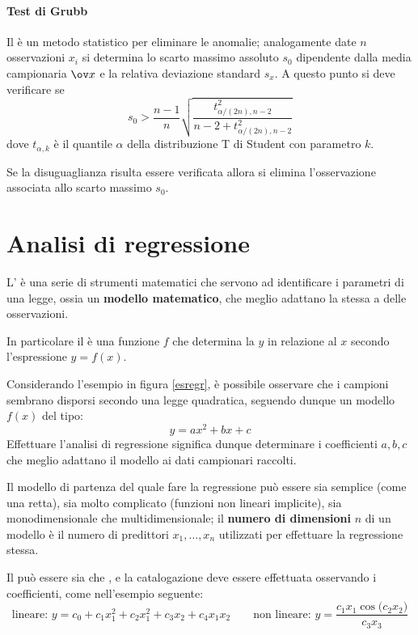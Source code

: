 		\paragraph{Test di Grubb} Il  è un metodo statistico per eliminare le anomalie; analogamente date $n$ osservazioni $x_i$ si determina lo scarto massimo assoluto $s_0$ dipendente dalla media campionaria $\ov x$ e la relativa deviazione standard $s_x$. A questo punto si deve verificare se
		\[ s_0 > \frac{ n - 1}{n} \sqrt{\frac{t^2_{\alpha/(2n), n-2}}{n-2+t^2_{\alpha/(2n), n-2}}} \]
		dove $t_{\alpha,k}$ è il quantile $\alpha$ della distribuzione T di Student con parametro $k$.
		
		Se la disuguaglianza risulta essere verificata allora si elimina l'osservazione associata allo scarto massimo $s_0$.
		
\section{Analisi di regressione}		
	L' è una serie di strumenti matematici che servono ad identificare i parametri di una legge, ossia un \textbf{modello matematico}, che meglio adattano la stessa a delle osservazioni.
	
	In particolare il  è una funzione $f$ che determina la  $y$ in relazione al  $x$ secondo l'espressione $y = f(x)$.
	
	
	Considerando l'esempio in figura \ref{esregr}, è possibile osservare che i campioni sembrano disporsi secondo una legge quadratica, seguendo dunque un modello $f(x)$ del tipo:
	\[ y = ax^2+bx+c \]
	Effettuare l'analisi di regressione significa dunque determinare i coefficienti $a,b,c$ che meglio adattano il modello ai dati campionari raccolti.
	
	Il modello di partenza del quale fare la regressione può essere sia semplice (come una retta), sia molto complicato (funzioni non lineari implicite), sia monodimensionale che multidimensionale; il \textbf{numero di dimensioni} $n$ di un modello è il numero di predittori $x_1, \dots, x_n$ utilizzati per effettuare la regressione stessa.
	
	Il  può essere sia  che , e la catalogazione deve essere effettuata osservando i coefficienti, come nell'esempio seguente:
	\[ \textrm{lineare: } y = c_0 +c_1x_1^2+c_2x_1^2+c_3x_2+c_4x_1x_2 \qquad \textrm{non lineare: } y = \frac{c_1x_1 \cos\big(c_2x_2\big)}{c_3x_3}\]
		
